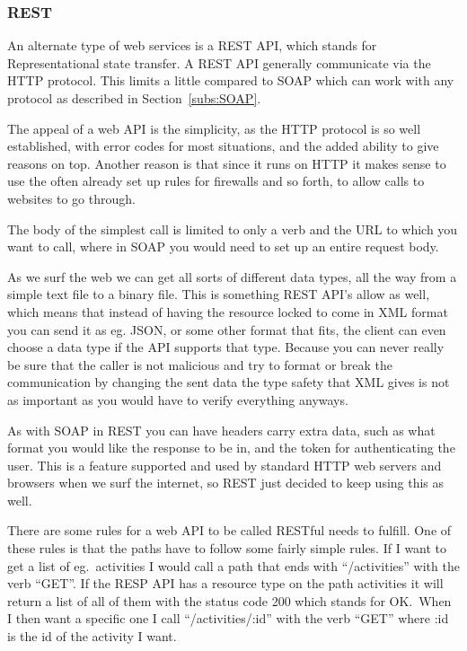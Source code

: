 \subsubsection{REST}
\label{subs:REST}
An alternate type of web services is a REST API, which stands for
Representational state transfer. A REST API generally communicate via the HTTP
protocol. This limits a little compared to SOAP which can work with any protocol
as described in Section~\ref{subs:SOAP}. 

The appeal of a web API is the simplicity, as the HTTP protocol is so well
established, with error codes for most situations, and the added ability to give
reasons on top. Another reason is that since it runs on HTTP it makes sense to
use the often already set up rules for firewalls and so forth, to allow calls to
websites to go through. 

The body of the simplest call is limited to only a verb and the URL to which you
want to call, where in SOAP you would need to set up an entire request body. 

As we surf the web we can get all sorts of different data types, all the way
from a simple text file to a binary file. This is something REST API's allow as
well, which means that instead of having the resource locked to come in XML
format you can send it as eg. JSON, or some other format that
fits\cite{rest:basic}, the client can even choose a data type if the API
supports that type. Because you can never really be sure that the caller is not 
malicious and try to format or break the communication by changing the sent data
the type safety that XML gives is not as important as you would have to verify
everything anyways. 

As with SOAP in REST you can have headers carry extra data, such as what format you
would like the response to be in, and the token for authenticating the user.
This is a feature supported and used by standard HTTP web servers and browsers when
we surf the internet, so REST just decided to keep using this as well. 

There are some rules for a web API to be called RESTful\cite{rest:msdn} needs to
fulfill. One of these rules is that the paths have to follow some fairly simple
rules. If I want to get a list of eg.\ activities I would call a path that ends
with ``/activities'' with the verb ``GET''. If the RESP API has a resource type on
the path activities it will return a list of all of them with the status code 200
which stands for OK.\ When I then want a specific one I call ``/activities/:id''
with the verb ``GET'' where :id is the id of the activity I want. 

